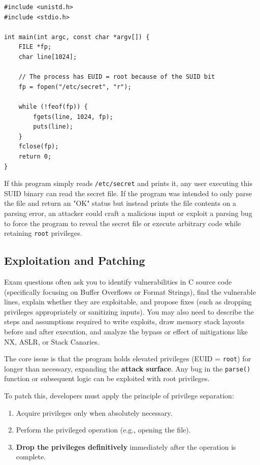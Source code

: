 \begin{verbatim}
#include <unistd.h>
#include <stdio.h>

int main(int argc, const char *argv[]) {
    FILE *fp;
    char line[1024];
    
    // The process has EUID = root because of the SUID bit
    fp = fopen("/etc/secret", "r"); 
    
    while (!feof(fp)) {
        fgets(line, 1024, fp);
        puts(line);
    }
    fclose(fp);
    return 0;
}
\end{verbatim}

If this program simply reads \texttt{/etc/secret} and prints it, any user executing this SUID binary can read the secret file. If the program was intended to only parse the file and return an "OK" status but instead prints the file contents on a parsing error, an attacker could craft a malicious input or exploit a parsing bug to force the program to reveal the secret file or execute arbitrary code while retaining \texttt{root} privileges.

\subsection{Exploitation and Patching}

\begin{tcolorbox}[colback=blue!5!white,colframe=blue!75!black,title=Exam Insight]
Exam questions often ask you to identify vulnerabilities in C source code (specifically focusing on Buffer Overflows or Format Strings), find the vulnerable lines, explain whether they are exploitable, and propose fixes (such as dropping privileges appropriately or sanitizing inputs). You may also need to describe the steps and assumptions required to write exploits, draw memory stack layouts before and after execution, and analyze the bypass or effect of mitigations like NX, ASLR, or Stack Canaries.
\end{tcolorbox}

The core issue is that the program holds elevated privileges (EUID = \texttt{root}) for longer than necessary, expanding the \textbf{attack surface}. Any bug in the \texttt{parse()} function or subsequent logic can be exploited with root privileges.

To patch this, developers must apply the principle of privilege separation:
\begin{enumerate}
    \item Acquire privileges only when absolutely necessary.
    \item Perform the privileged operation (e.g., opening the file).
    \item \textbf{Drop the privileges definitively} immediately after the operation is complete.
\end{enumerate}

